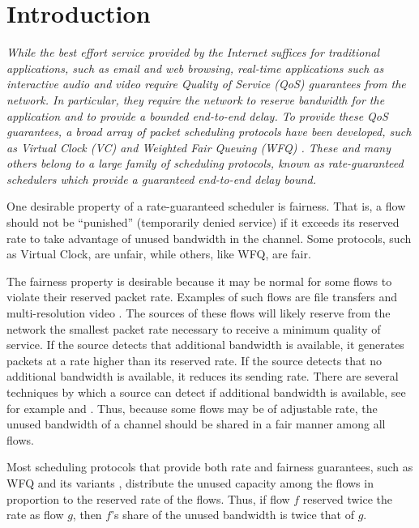 \documentclass[conference]{IEEEtran}
\begin{document}
\section{Introduction}
%
{\em While the best effort service provided by the Internet suffices for 
traditional applications, such as email and web browsing, real-time 
applications such as interactive audio and video require Quality of Service 
(QoS)
guarantees from the network. In particular, they require the network to reserve bandwidth for the application and to provide a bounded end-to-end delay. To provide these QoS guarantees, a broad array of packet
scheduling protocols have been developed, such as Virtual Clock (VC) \cite{VC-Lam, VC-Lixia} and Weighted Fair Queuing (WFQ) \cite{GPS-Parekh}. These and many others belong to a large family of scheduling protocols, known as rate-guaranteed schedulers \cite{Cobb-Flow-Theory-ToN,leaveintime,NOSSDAV-95-Vin} which provide a guaranteed end-to-end delay bound.


One desirable property of a rate-guaranteed scheduler is fairness. That is, a flow should not be ``punished'' (temporarily denied service) if it exceeds its reserved rate to take advantage of unused bandwidth in the channel. Some protocols, such as Virtual Clock, are unfair, while others, like WFQ, are fair. 

The fairness property is desirable because it may be normal for some flows to violate their reserved packet rate. Examples of such flows are file transfers and multi-resolution video \cite{hopbyhop}. The sources of these flows will likely  reserve from the network the smallest packet rate necessary to receive a minimum quality of service. If the source detects that additional bandwidth is available, it generates packets at a rate higher than its reserved rate. If the source detects that no additional bandwidth is available, it reduces its sending rate. There are several techniques by which a source can detect if additional bandwidth is available, see for example \cite{Packet-Pair} and \cite{DecBit}. Thus, because some flows may be of adjustable rate, the unused bandwidth of a channel should be shared in a fair manner among all flows.


Most scheduling protocols that provide both rate and fairness guarantees, such as WFQ and its variants \cite{GPS-Parekh} \cite{Hui-Hierarchical-WFQ} \cite{Cobb-TS-Scheduling-ToN} \cite{SCFQ-Golestani} \cite{Hui-WF2Q}, distribute the unused capacity among the flows in proportion to the reserved rate of the flows. Thus, if flow $f$ reserved twice the rate as flow $g$, then $f$'s share of the unused bandwidth is twice that of $g$. 

}
\end{document}
